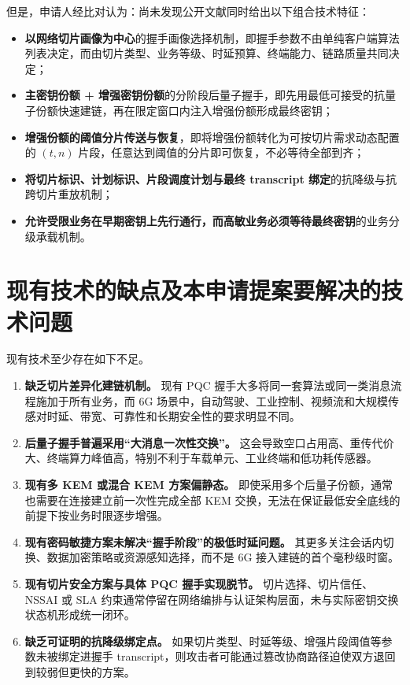 \documentclass[12pt,a4paper]{article}
\begin{document}
但是，申请人经比对认为：尚未发现公开文献同时给出以下组合技术特征：

\begin{itemize}[leftmargin=2em]
    \item \textbf{以网络切片画像为中心}的握手画像选择机制，即握手参数不由单纯客户端算法列表决定，而由切片类型、业务等级、时延预算、终端能力、链路质量共同决定；
    \item \textbf{主密钥份额 + 增强密钥份额}的分阶段后量子握手，即先用最低可接受的抗量子份额快速建链，再在限定窗口内注入增强份额形成最终密钥；
    \item \textbf{增强份额的阈值分片传送与恢复}，即将增强份额转化为可按切片需求动态配置的 $(t,n)$ 片段，任意达到阈值的分片即可恢复，不必等待全部到齐；
    \item \textbf{将切片标识、计划标识、片段调度计划与最终 transcript 绑定}的抗降级与抗跨切片重放机制；
    \item \textbf{允许受限业务在早期密钥上先行通行，而高敏业务必须等待最终密钥}的业务分级承载机制。
\end{itemize}

\section{现有技术的缺点及本申请提案要解决的技术问题}

现有技术至少存在如下不足。

\begin{enumerate}[leftmargin=2em]
    \item \textbf{缺乏切片差异化建链机制。} 现有 PQC 握手大多将同一套算法或同一类消息流程施加于所有业务，而 6G 场景中，自动驾驶、工业控制、视频流和大规模传感对时延、带宽、可靠性和长期安全性的要求明显不同。
    \item \textbf{后量子握手普遍采用“大消息一次性交换”。} 这会导致空口占用高、重传代价大、终端算力峰值高，特别不利于车载单元、工业终端和低功耗传感器。
    \item \textbf{现有多 KEM 或混合 KEM 方案偏静态。} 即使采用多个后量子份额，通常也需要在连接建立前一次性完成全部 KEM 交换，无法在保证最低安全底线的前提下按业务时限逐步增强。
    \item \textbf{现有密码敏捷方案未解决“握手阶段”的极低时延问题。} 其更多关注会话内切换、数据加密策略或资源感知选择，而不是 6G 接入建链的首个毫秒级时窗。
    \item \textbf{现有切片安全方案与具体 PQC 握手实现脱节。} 切片选择、切片信任、NSSAI 或 SLA 约束通常停留在网络编排与认证架构层面，未与实际密钥交换状态机形成统一闭环。
    \item \textbf{缺乏可证明的抗降级绑定点。} 如果切片类型、时延等级、增强片段阈值等参数未被绑定进握手 transcript，则攻击者可能通过篡改协商路径迫使双方退回到较弱但更快的方案。
\end{enumerate}
\end{document}
